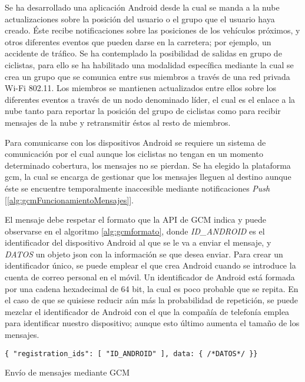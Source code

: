 Se ha desarrollado una aplicación Android desde la cual se manda a la nube actualizaciones sobre la posición del usuario o el grupo que el usuario haya creado. Éste recibe notificaciones sobre las posiciones de los vehículos próximos, y otros diferentes eventos que pueden darse en la carretera; por ejemplo, un accidente de tráfico. Se ha contemplado la posibilidad de salidas en grupo de ciclistas, para ello se ha habilitado una modalidad específica mediante la cual se crea un grupo que se comunica entre sus miembros a través de una red privada Wi-Fi 802.11. Los miembros se mantienen actualizados entre ellos sobre los diferentes eventos a través de un nodo denominado líder, el cual es el enlace a la nube tanto para reportar la posición del grupo de ciclistas como para recibir mensajes de la nube y retransmitir éstos al resto de miembros.

Para comunicarse con los dispositivos Android se requiere un sistema de comunicación por el cual aunque los ciclistas no tengan en un momento determinado cobertura, los mensajes no se pierdan. Se ha elegido la plataforma \gls{gcm}, la cual se encarga de gestionar que los mensajes lleguen al destino aunque éste se encuentre temporalmente inaccesible mediante notificaciones \emph{Push} [\ref{alg:gcmFuncionamientoMensajes}].

El mensaje debe respetar el formato que la API de GCM indica y puede observarse en el algoritmo \ref{alg:gcmformato}, donde \emph{ID\_ANDROID} es el identificador del dispositivo Android al que se le va a enviar el mensaje, y \emph{DATOS} un objeto \gls{json} con la información se que desea enviar. Para crear un identificador único, se puede emplear el que crea Android cuando se introduce la cuenta de correo personal en el móvil. Un identificador de Android está formada por una cadena hexadecimal de 64 bit, la cual es poco probable que se repita. En el caso de que se quisiese reducir aún más la probabilidad de repetición, se puede mezclar el identificador de Android con el que la compañía de telefonía emplea para identificar nuestro dispositivo; aunque esto último aumenta el tamaño de los mensajes.

\begin{listing}
	\begin{minipage}{.4\textwidth}
		\begin{verbatim}
{ "registration_ids": [ "ID_ANDROID" ], data: { /*DATOS*/ }}
		\end{verbatim}
	\end{minipage}
	\caption{Envío de mensajes mediante GCM}\label{alg:gcmformato}
\end{listing}

